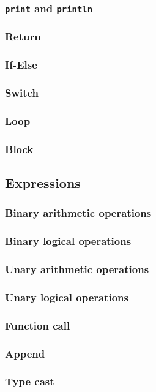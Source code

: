 \documentclass{article}
\begin{document}
\subsubsection*{\texttt{print} and \texttt{println}}
\subsubsection*{Return}
\subsubsection*{If-Else}
\subsubsection*{Switch}
\subsubsection*{Loop}
\subsubsection*{Block}

\subsection*{Expressions}

\subsubsection*{Binary arithmetic operations}
\subsubsection*{Binary logical operations}
\subsubsection*{Unary arithmetic operations}
\subsubsection*{Unary logical operations}
\subsubsection*{Function call}
\subsubsection*{Append}
\subsubsection*{Type cast}
\end{document}
